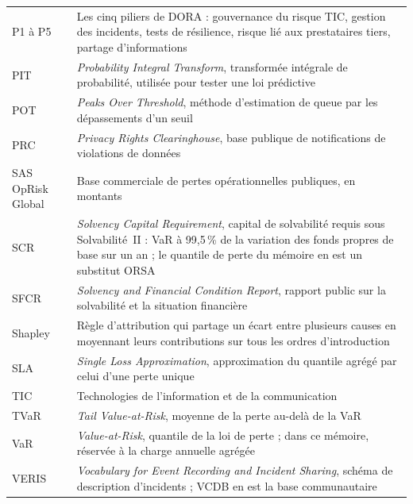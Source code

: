 \begin{center}
\begin{longtable}{@{}>{\raggedright\arraybackslash}p{2.6cm}>{\raggedright\arraybackslash}p{12.2cm}@{}}
P1 à P5 & Les cinq piliers de DORA : gouvernance du risque TIC, gestion des incidents, tests de résilience, risque lié aux prestataires tiers, partage d'informations \\
PIT & \emph{Probability Integral Transform}, transformée intégrale de probabilité, utilisée pour tester une loi prédictive \\
POT & \emph{Peaks Over Threshold}, méthode d'estimation de queue par les dépassements d'un seuil \\
PRC & \emph{Privacy Rights Clearinghouse}, base publique de notifications de violations de données \\
SAS OpRisk Global & Base commerciale de pertes opérationnelles publiques, en montants \\
SCR & \emph{Solvency Capital Requirement}, capital de solvabilité requis sous Solvabilité~II : VaR à 99,5\,\% de la variation des fonds propres de base sur un an ; le quantile de perte du mémoire en est un substitut ORSA \\
SFCR & \emph{Solvency and Financial Condition Report}, rapport public sur la solvabilité et la situation financière \\
Shapley & Règle d'attribution qui partage un écart entre plusieurs causes en moyennant leurs contributions sur tous les ordres d'introduction \\
SLA & \emph{Single Loss Approximation}, approximation du quantile agrégé par celui d'une perte unique \\
TIC & Technologies de l'information et de la communication \\
TVaR & \emph{Tail Value-at-Risk}, moyenne de la perte au-delà de la VaR \\
VaR & \emph{Value-at-Risk}, quantile de la loi de perte ; dans ce mémoire, réservée à la charge annuelle agrégée \\
VERIS & \emph{Vocabulary for Event Recording and Incident Sharing}, schéma de description d'incidents ; VCDB en est la base communautaire \\
\bottomrule
\end{longtable}
\end{center}
